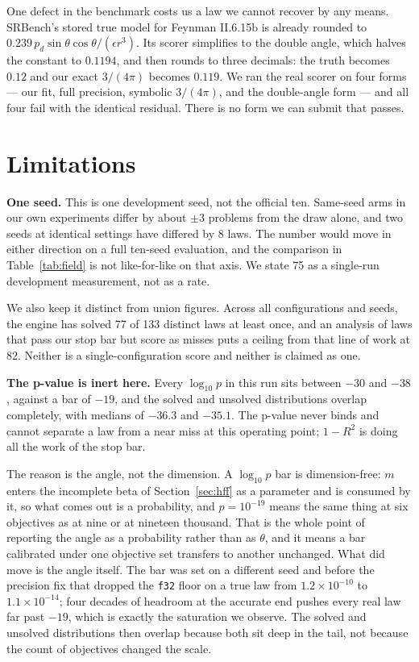 \documentclass[11pt,a4paper]{article}
\begin{document}
One defect in the benchmark costs us a law we cannot
recover by any means. SRBench's stored true model for Feynman II.6.15b is already
rounded to $0.239\, p_d \sin\theta\cos\theta / (\epsilon r^3)$. Its scorer
simplifies to the double angle, which halves the constant to $0.1194$, and then
rounds to three decimals: the truth becomes $0.12$ and our exact $3/(4\pi)$
becomes $0.119$. We ran the real scorer on four forms --- our fit, full precision,
symbolic $3/(4\pi)$, and the double-angle form --- and all four fail with the
identical residual. There is no form we can submit that passes.

\section{Limitations}
\label{sec:limits}

\textbf{One seed.} This is one development seed, not the official ten. Same-seed
arms in our own experiments differ by about $\pm3$ problems from the draw alone,
and two seeds at identical settings have differed by 8 laws. The number would
move in either direction on a full ten-seed evaluation, and the comparison in
Table~\ref{tab:field} is not like-for-like on that axis. We state 75 as a
single-run development measurement, not as a rate.

We also keep it distinct from union figures. Across all configurations and seeds,
the engine has solved 77 of 133 distinct laws at least once, and an analysis of
laws that pass our stop bar but score as misses puts a ceiling from that line of
work at 82. Neither is a single-configuration score and neither is claimed as
one.

\textbf{The p-value is inert here.} Every $\log_{10} p$ in this run sits between
$-30$ and $-38$, against a bar of $-19$, and the solved and unsolved distributions
overlap completely, with medians of $-36.3$ and $-35.1$. The p-value never binds
and cannot separate a law from a near miss at this operating point; $1 - R^2$ is
doing all the work of the stop bar.

The reason is the angle, not the dimension. A $\log_{10} p$ bar is
dimension-free: $m$ enters the incomplete beta of Section~\ref{sec:hff} as a
parameter and is consumed by it, so what comes out is a probability, and $p =
10^{-19}$ means the same thing at six objectives as at nine or at nineteen
thousand. That is the whole point of reporting the angle as a probability rather
than as $\theta$, and it means a bar calibrated under one objective set
transfers to another unchanged. What did move is the angle itself. The bar was
set on a different seed and before the precision fix that dropped the
\texttt{f32} floor on a true law from $1.2\times10^{-10}$ to
$1.1\times10^{-14}$; four decades of headroom at the accurate end pushes every
real law far past $-19$, which is exactly the saturation we observe. The
solved and unsolved distributions then overlap because both sit deep in the tail,
not because the count of objectives changed the scale.
\end{document}
